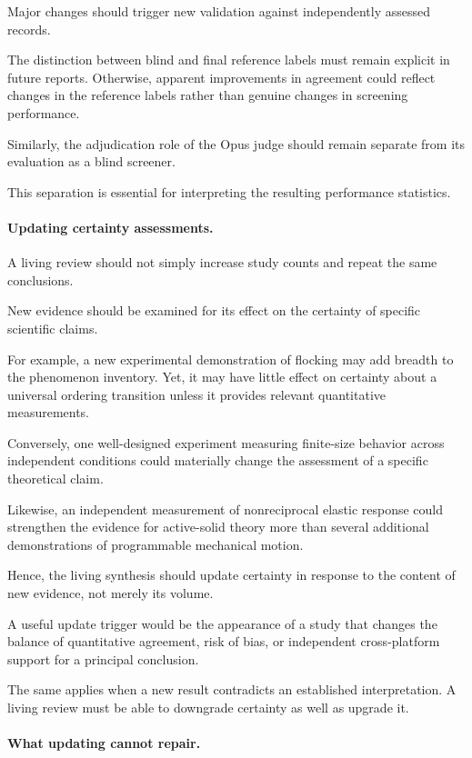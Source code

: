 Major changes
should trigger
new validation
against independently
assessed records.

The distinction
between blind
and final
reference labels
must remain
explicit in
future reports.
Otherwise, apparent
improvements in
agreement could
reflect changes
in the reference
labels rather
than genuine
changes in
screening performance.

Similarly,
the adjudication
role of the
Opus judge
should remain
separate from
its evaluation
as a blind
screener.

This separation
is essential
for interpreting
the resulting
performance
statistics.

\paragraph*{Updating certainty assessments.}

A living review
should not simply
increase study
counts and
repeat the
same conclusions.

New evidence
should be
examined for
its effect
on the certainty
of specific
scientific claims.

For example,
a new experimental
demonstration of
flocking may add
breadth to the
phenomenon inventory.
Yet, it may
have little effect
on certainty
about a
universal
ordering transition
unless it
provides relevant
quantitative
measurements.

Conversely,
one well-designed
experiment measuring
finite-size behavior
across independent
conditions could
materially change
the assessment
of a specific
theoretical claim.

Likewise,
an independent
measurement of
nonreciprocal
elastic response
could strengthen
the evidence
for active-solid
theory more
than several
additional
demonstrations of
programmable
mechanical motion.

Hence, the
living synthesis
should update
certainty in
response to
the content
of new evidence,
not merely
its volume.

A useful
update trigger
would be
the appearance
of a study
that changes
the balance
of quantitative
agreement,
risk of bias,
or independent
cross-platform
support for
a principal
conclusion.

The same applies
when a new
result contradicts
an established
interpretation.
A living review
must be able
to downgrade
certainty as
well as
upgrade it.

\paragraph*{What updating cannot repair.}

